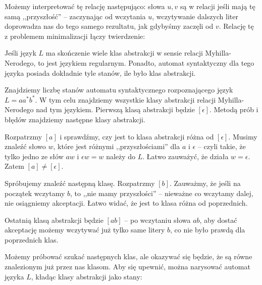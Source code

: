 Możemy interpretować tę relację następująco: słowa $u, v$ są w relacji jeśli mają tę samą ,,przyszłość'' -- zaczynając od wczytania $u$, wczytywanie dalszych liter doprowadza nas do tego samego rezultatu, jak gdybyśmy zaczęli od $v$. Relację tę z problemem minimalizacji łączy twierdzenie:

Jeśli język $L$ ma skończenie wiele klas abstrakcji w sensie relacji Myhilla-Nerodego, to jest językiem regularnym. Ponadto, automat syntaktyczny dla tego języka posiada dokładnie tyle stanów, ile było klas abstrakcji.

\begin{example}
Znajdziemy liczbę stanów automatu syntaktycznego rozpoznającego język $L = aa^*b^*$. W tym celu znajdziemy wszystkie klasy abstrakcji relacji Myhilla-Nerodego nad tym językiem. Pierwszą klasą abstrakcji będzie $[\epsilon]$. Metodą prób i błędów znajdziemy następne klasy abstrakcji.

Rozpatrzmy $[a]$ i sprawdźmy, czy jest to klasa abstrakcji różna od $[\epsilon]$. Musimy znaleźć słowo $w$, które jest różnymi ,,przyszłościami'' dla $a$ i $\epsilon$ -- czyli takie, że tylko jedno ze słów $aw$ i $\epsilon w = w$ należy do $L$. Łatwo zauważyć, że działa $w = \epsilon$. Zatem $[a] \not= [\epsilon]$. 

Spróbujemy znaleźć następną klasę. Rozpatrzmy $[b]$. Zauważmy, że jeśli na początek wczytamy $b$, to ,,nie mamy przyszłości'' -- nieważne co wczytamy dalej, nie osiągniemy akceptacji. Łatwo widać, że jest to klasa różna od poprzednich.

Ostatnią klasą abstrakcji będzie $[ab]$ -- po wczytaniu słowa $ab$, aby dostać akceptację możemy wczytywać już tylko same litery $b$, co nie było prawdą dla poprzednich klas.

Możemy próbować szukać następnych klas, ale okazywać się będzie, że są równe znalezionym już przez nas klasom. Aby się upewnić, można narysować automat języka $L$, kładąc klasy abstrakcji jako stany:


\end{example}

